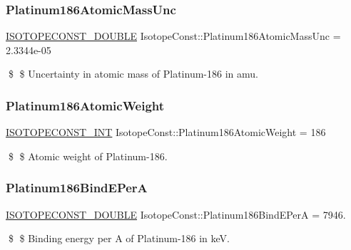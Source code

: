 \subsubsection{\texorpdfstring{Platinum186\+Atomic\+Mass\+Unc}{Platinum186AtomicMassUnc}}
{\footnotesize\ttfamily \mbox{\hyperlink{group___isotope_const-_macros_ga8f45a7272ce02c0b4c65c44636ed719a}{I\+S\+O\+T\+O\+P\+E\+C\+O\+N\+S\+T\+\_\+\+D\+O\+U\+B\+LE}} Isotope\+Const\+::\+Platinum186\+Atomic\+Mass\+Unc = 2.\+3344e-\/05}

\$ \$ Uncertainty in atomic mass of Platinum-\/186 in amu. \mbox{\label{group___isotope_const-_platinum-_pt186_ga734c099451eeefc39f6fffa269dec7d7}} 
\subsubsection{\texorpdfstring{Platinum186\+Atomic\+Weight}{Platinum186AtomicWeight}}
{\footnotesize\ttfamily \mbox{\hyperlink{group___isotope_const-_macros_ga5f18360b3e99483a35c32d789e62621c}{I\+S\+O\+T\+O\+P\+E\+C\+O\+N\+S\+T\+\_\+\+I\+NT}} Isotope\+Const\+::\+Platinum186\+Atomic\+Weight = 186}

\$ \$ Atomic weight of Platinum-\/186. \mbox{\label{group___isotope_const-_platinum-_pt186_ga71cfddf2596fa64a1018b220fec9d070}} 
\subsubsection{\texorpdfstring{Platinum186\+Bind\+E\+PerA}{Platinum186BindEPerA}}
{\footnotesize\ttfamily \mbox{\hyperlink{group___isotope_const-_macros_ga8f45a7272ce02c0b4c65c44636ed719a}{I\+S\+O\+T\+O\+P\+E\+C\+O\+N\+S\+T\+\_\+\+D\+O\+U\+B\+LE}} Isotope\+Const\+::\+Platinum186\+Bind\+E\+PerA = 7946.}

\$ \$ Binding energy per A of Platinum-\/186 in keV. \mbox{\label{group___isotope_const-_platinum-_pt186_ga6daa6e78b42c7084a5bb66745b2d0d58}} 
